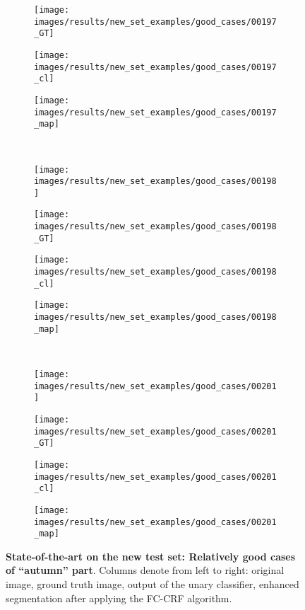 \begin{figure}[t]
\begin{subfigure}[c]{0.24\textwidth}
 \end{subfigure}
 \begin{subfigure}[c]{0.24\textwidth}
  \centering
  \texttt{[image: images/results/new\_set\_examples/good\_cases/00197\_GT]}
 \end{subfigure}
 \begin{subfigure}[c]{0.24\textwidth}
  \centering
  \texttt{[image: images/results/new\_set\_examples/good\_cases/00197\_cl]}
 \end{subfigure}
 \begin{subfigure}[c]{0.24\textwidth}
  \centering
  \texttt{[image: images/results/new\_set\_examples/good\_cases/00197\_map]}
 \end{subfigure}
 \\
 \begin{subfigure}[c]{0.24\textwidth}
  \centering
  \texttt{[image: images/results/new\_set\_examples/good\_cases/00198]}
 \end{subfigure}
 \begin{subfigure}[c]{0.24\textwidth}
  \centering
  \texttt{[image: images/results/new\_set\_examples/good\_cases/00198\_GT]}
 \end{subfigure}
 \begin{subfigure}[c]{0.24\textwidth}
  \centering
  \texttt{[image: images/results/new\_set\_examples/good\_cases/00198\_cl]}
 \end{subfigure}
 \begin{subfigure}[c]{0.24\textwidth}
  \centering
  \texttt{[image: images/results/new\_set\_examples/good\_cases/00198\_map]}
 \end{subfigure}
 \\
 \begin{subfigure}[c]{0.24\textwidth}
  \centering
  \texttt{[image: images/results/new\_set\_examples/good\_cases/00201]}
 \end{subfigure}
 \begin{subfigure}[c]{0.24\textwidth}
  \centering
  \texttt{[image: images/results/new\_set\_examples/good\_cases/00201\_GT]}
 \end{subfigure}
 \begin{subfigure}[c]{0.24\textwidth}
  \centering
  \texttt{[image: images/results/new\_set\_examples/good\_cases/00201\_cl]}
 \end{subfigure}
 \begin{subfigure}[c]{0.24\textwidth}
  \centering
  \texttt{[image: images/results/new\_set\_examples/good\_cases/00201\_map]}
 \end{subfigure}
 
 \caption[State-of-the-art on the new test set: Relatively good cases of ``autumn'' part]{
 {\bf State-of-the-art on the new test set: Relatively good cases of ``autumn'' part}.
 Columns denote from left to right: original image, ground truth image, output of the unary classifier, enhanced segmentation after applying
 the FC-CRF algorithm.}\label{fig:fc_crf_good_autumn}
\end{figure}

